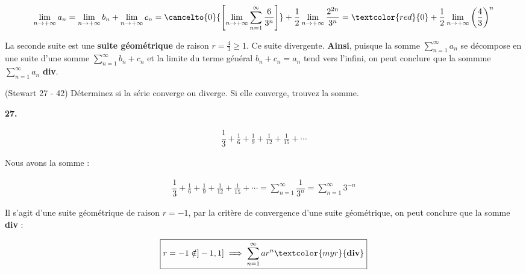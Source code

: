 \documentclass{report}
\begin{document}
    \begin{align*}
        \lim\limits_{n \to+\infty }a_n = 
        \lim\limits_{n \to+\infty }b_n  
        + 
        \lim\limits_{n \to+\infty }c_n 
        = 
        \cancelto{0}{
        \left[ 
            \lim\limits_{n\to+\infty }\sum_{n=1}^{\infty }\frac{6}{3^n} 
        \right]}
        +
        \dfrac{1}{2}
        \lim\limits_{n \to+\infty} \dfrac{2^{2n}}{3^n}
        = \textcolor{red}{0} +   
        \frac{1}{2} 
        \lim\limits_{n \to+\infty} \left(\dfrac{4}{3}\right)^n 
    \end{align*}                    


    La seconde suite est une \textbf{suite géométrique} de raison 
    $r  = \frac{4}{3} \geq 1$. Ce suite divergente. \textbf{Ainsi}, puisque 
    la somme $\sum_{n=1}^{\infty }a_n$ se décompose en une suite 
    d'une somme $\sum_{n=1}^{\infty }b_n + c_n$ et la limite 
    du terme général 
    $b_n + c_n = a_n$ tend vers l'infini, on peut conclure que la 
    sommme $\sum_{n=1}^{\infty }a_n$ \textcolor{myr}{\textbf{div}}. 

    \begin{Exercice}{(Stewart 27 - 42)}{}
        Déterminez si la série converge ou diverge. Si elle converge, trouvez 
        la somme.
    \end{Exercice}

    \vspace{1em}
    \noindent
    \textbf{27.}  

    \begin{align*}
        \dfrac{1}{3} + \frac{1}{6} + \frac{1}{9} + \frac{1}{12} + \frac{1}{15} + \cdots    
    \end{align*}

    Nous avons la somme : 
    

    \begin{align*}
        \dfrac{1}{3} + \frac{1}{6} + \frac{1}{9} + \frac{1}{12} + \frac{1}{15} + \cdots    
        = 
        \sum_{n=1}^{\infty }\dfrac{1}{3^n} = \sum_{n=1}^{\infty }3^{-n}
    \end{align*}

    Il s'agit d'une suite géométrique de raison $r =  -1$, par la critère de convergence 
    d'une suite géométrique, on peut conclure que la somme \textcolor{myr}{\textbf{div}} :

    \begin{align*}
        \boxed{
        r = -1 \notin ]-1, 1] \implies \sum_{n=1}^{\infty }ar^n \textcolor{myr}{\textbf{div}} 
    }
    \end{align*}                                                                                                                                                                                                                                                                                                                                                                                                                        
\end{document}
